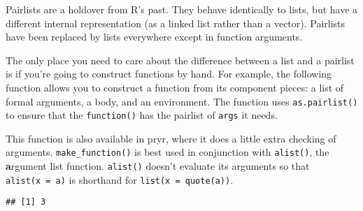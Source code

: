 Pairlists are a holdover from R's past. They behave identically to
lists, but have a different internal representation (as a linked list
rather than a vector). Pairlists have been replaced by lists everywhere
except in function arguments. 

The only place you need to care about the difference between a list and
a pairlist is if you're going to construct functions by hand. For
example, the following function allows you to construct a function from
its component pieces: a list of formal arguments, a body, and an
environment. The function uses \texttt{as.pairlist()} to ensure that the
\texttt{function()} has the pairlist of \texttt{args} it needs.
 

\begin{Shaded}
\begin{Highlighting}[]
\StringTok{ } \NormalTok{()) \{}
\StringTok{ }

  \NormalTok{(}\NormalTok{(}
\NormalTok{\}}
\end{Highlighting}
\end{Shaded}

This function is also available in pryr, where it does a little extra
checking of arguments. \texttt{make\_function()} is best used in
conjunction with \texttt{alist()}, the \textbf{a}rgument list function.
\texttt{alist()} doesn't evaluate its arguments so that
\texttt{alist(x\ =\ a)} is shorthand for \texttt{list(x\ =\ quote(a))}.

\begin{Shaded}
\begin{Highlighting}[]
\StringTok{ }\NormalTok{(}\NormalTok{(} \NormalTok{, } \NormalTok{), }\OperatorTok{+}\StringTok{ }
\NormalTok{(}\NormalTok{)}
\end{Highlighting}
\end{Shaded}

\begin{verbatim}
## [1] 3
\end{verbatim}

